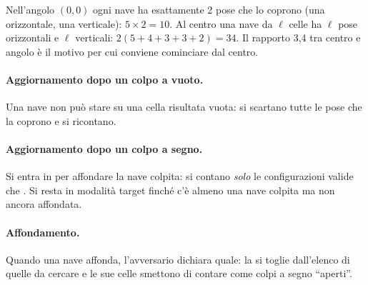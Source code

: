 \begin{osservazione}
Nell'angolo $(0,0)$ ogni nave ha esattamente 2 pose che lo coprono (una orizzontale, una
verticale): $5 \times 2 = 10$. Al centro una nave da $\ell$ celle ha $\ell$ pose orizzontali
e $\ell$ verticali: $2(5+4+3+3+2) = 34$. Il rapporto 3,4 tra centro e angolo è il motivo
per cui conviene cominciare dal centro.
\end{osservazione}

\paragraph{Aggiornamento dopo un colpo a vuoto.}
Una nave non può stare su una cella risultata vuota: si scartano tutte le pose che la
coprono e si ricontano.

\paragraph{Aggiornamento dopo un colpo a segno.}
Si entra in  per affondare la nave colpita: si contano \emph{solo} le
configurazioni valide che . Si resta in modalità target
finché c'è almeno una nave colpita ma non ancora affondata.

\paragraph{Affondamento.}
Quando una nave affonda, l'avversario dichiara quale: la si toglie dall'elenco di quelle da
cercare e le sue celle smettono di contare come colpi a segno ``aperti''.

